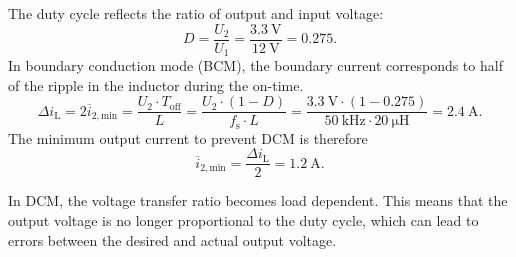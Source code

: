

\begin{solutionblock}
	The duty cycle reflects the ratio of output and input voltage:
	\begin{equation*}
		D=\frac{U_\mathrm{2}}{U_\mathrm{1}} = \frac{\SI{3.3}{\volt}}{\SI{12}{\volt}}  = 0.275.
	\end{equation*}
	In boundary conduction mode (BCM), the boundary current corresponds to half of the ripple in the inductor during the on-time.
	\begin{equation*}
		\Delta i_\mathrm{L}=2  \overline{i}_\mathrm{2,min} = \frac{U_\mathrm{2} \cdot T_\mathrm{off}}{L}
		= \frac{U_\mathrm{2} \cdot (1-D)}{f_\mathrm{s} \cdot L} = \frac{\SI{3.3}{\volt} \cdot (1-0.275)}{\SI{50}{\kilo\hertz} \cdot \SI{20}{\micro\henry}}
		= \SI{2.4}{\ampere}.
	\end{equation*}
	The minimum output current to prevent DCM is therefore
	\begin{equation*}
		\overline{i}_\mathrm{2,min}  = \frac{\Delta i_\mathrm{L}}{2}=\SI{1.2}{\ampere}.
	\end{equation*}

\end{solutionblock}



\begin{solutionblock}
	In DCM, the voltage transfer ratio becomes load dependent. This means that the output voltage is no longer proportional to the duty cycle, which can lead to errors between the desired and actual output voltage.
\end{solutionblock}

